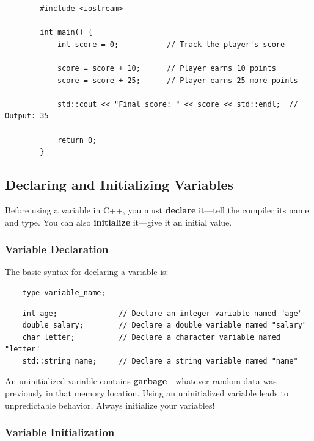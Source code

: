 \begin{example}{\leavevmode}
	
	\begin{lstlisting}
		#include <iostream>
		
		int main() {
			int score = 0;           // Track the player's score
			
			score = score + 10;      // Player earns 10 points
			score = score + 25;      // Player earns 25 more points
			
			std::cout << "Final score: " << score << std::endl;  // Output: 35
			
			return 0;
		}
	\end{lstlisting}
\end{example}

\subsection{Declaring and Initializing Variables}

Before using a variable in C++, you must \textbf{declare} it—tell the compiler its name and type. You can also \textbf{initialize} it—give it an initial value.

\subsubsection{Variable Declaration}

The basic syntax for declaring a variable is:

\begin{lstlisting}
	type variable_name;
\end{lstlisting}

\begin{lstlisting}
	int age;              // Declare an integer variable named "age"
	double salary;        // Declare a double variable named "salary"
	char letter;          // Declare a character variable named "letter"
	std::string name;     // Declare a string variable named "name"
\end{lstlisting}

\begin{remark}
	An uninitialized variable contains \textbf{garbage}—whatever random data was previously in that memory location. Using an uninitialized variable leads to unpredictable behavior. Always initialize your variables!
\end{remark}

\subsubsection{Variable Initialization}

